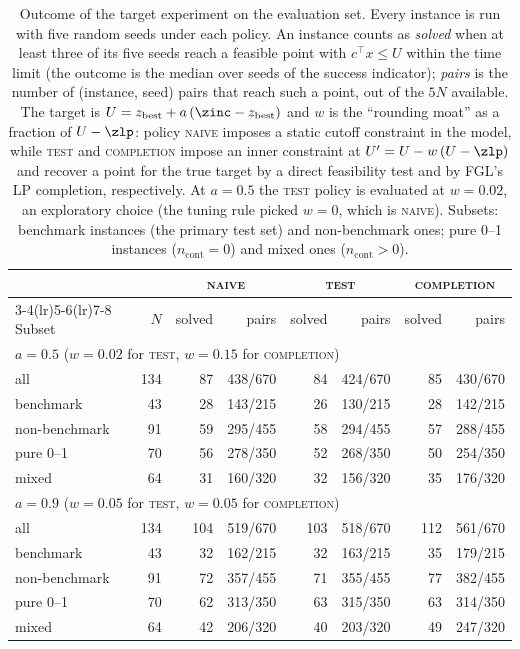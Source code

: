 \begin{table}[t]
\centering
\caption{Outcome of the target experiment on the evaluation set. Every instance is run
with five random seeds under each policy. An instance counts as \emph{solved} when at least
three of its five seeds reach a feasible point with $c^{\top}x \le U$ within the time limit
(the outcome is the median over seeds of the success indicator); \emph{pairs} is the number of
(instance, seed) pairs that reach such a point, out of the $5N$ available. The target is
$U = z_{\mathrm{best}} + a\,(\zinc - z_{\mathrm{best}})$ and $w$ is the ``rounding moat''
as a fraction of $U - \zlp$:
policy \textsc{naive} imposes a static cutoff constraint in the model, while \textsc{test} and \textsc{completion} impose an inner constraint at $U' = U - w\,(U - \zlp)$ and recover a point for the true target by a direct feasibility test and by FGL's LP completion, respectively. At $a=0.5$ the \textsc{test} policy is evaluated at $w=0.02$, an exploratory choice
(the tuning rule picked $w=0$, which is \textsc{naive}). Subsets: benchmark instances (the
primary test set) and non-benchmark ones; pure 0--1
instances ($n_{\mathrm{cont}}=0$) and mixed ones ($n_{\mathrm{cont}}>0$).}
\label{tab:target-outcome}
\small
\setlength{\tabcolsep}{4pt}
\begin{tabular}{lr rr rr rr}
\toprule
& & \multicolumn{2}{c}{\textsc{naive}} & \multicolumn{2}{c}{\textsc{test}} & \multicolumn{2}{c}{\textsc{completion}} \\
\cmidrule(lr){3-4}\cmidrule(lr){5-6}\cmidrule(lr){7-8}
Subset & $N$ & solved & pairs & solved & pairs & solved & pairs \\
\midrule
\multicolumn{8}{l}{$a=0.5$ \quad ($w=0.02$ for \textsc{test}, $w=0.15$ for \textsc{completion})} \\
\addlinespace[1pt]
\quad all & 134 & 87 & 438/670 & 84 & 424/670 & 85 & 430/670 \\
\quad benchmark & 43 & 28 & 143/215 & 26 & 130/215 & 28 & 142/215 \\
\quad non-benchmark & 91 & 59 & 295/455 & 58 & 294/455 & 57 & 288/455 \\
\quad pure 0--1 & 70 & 56 & 278/350 & 52 & 268/350 & 50 & 254/350 \\
\quad mixed & 64 & 31 & 160/320 & 32 & 156/320 & 35 & 176/320 \\
\midrule
\multicolumn{8}{l}{$a=0.9$ \quad ($w=0.05$ for \textsc{test}, $w=0.05$ for \textsc{completion})} \\
\addlinespace[1pt]
\quad all & 134 & 104 & 519/670 & 103 & 518/670 & 112 & 561/670 \\
\quad benchmark & 43 & 32 & 162/215 & 32 & 163/215 & 35 & 179/215 \\
\quad non-benchmark & 91 & 72 & 357/455 & 71 & 355/455 & 77 & 382/455 \\
\quad pure 0--1 & 70 & 62 & 313/350 & 63 & 315/350 & 63 & 314/350 \\
\quad mixed & 64 & 42 & 206/320 & 40 & 203/320 & 49 & 247/320 \\
\bottomrule
\end{tabular}
\end{table}
